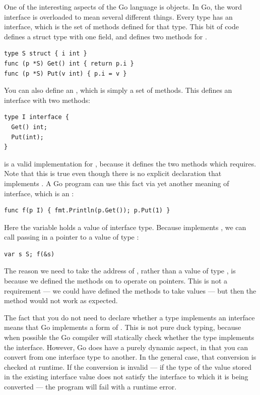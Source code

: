 \noindent{}One of the interesting aspects of the Go language is  objects.
In Go, the word interface is overloaded to mean several different
things. Every type has an interface, which is the set of methods defined for
that type. This bit of code defines a struct type  with one field, and
defines two methods for .
\begin{lstlisting}
type S struct { i int }
func (p *S) Get() int { return p.i }
func (p *S) Put(v int) { p.i = v }
\end{lstlisting}
You can also define an , which is simply a set of methods.
This defines an interface  with two methods:
\begin{lstlisting}
type I interface {
  Get() int;
  Put(int);
}
\end{lstlisting}
 is a valid implementation for , because it defines the two 
methods which  requires. Note that this is true even though there is 
no explicit declaration that  implements . A Go program can use 
this fact via yet another meaning of interface, which is an :

\begin{lstlisting}
func f(p I) { fmt.Println(p.Get()); p.Put(1) }
\end{lstlisting}
Here the variable  holds a value of interface type. Because
implements , we can call  passing in a pointer to a value of type
:

\begin{lstlisting}
var s S; f(&s)
\end{lstlisting}
The reason we need to take the address of , rather than a value of type
, is because we defined the methods on  to operate on pointers. This
is not a requirement --- we could have defined the methods to take
values --- but then the  method would not work as expected.

The fact that you do not need to declare whether a type implements an
interface means that Go implements a form of . This is not
pure duck typing, because when possible the Go compiler will statically
check whether the type implements the interface. However, Go does have a
purely dynamic aspect, in that you can convert from one interface type
to another. In the general case, that conversion is checked at runtime.
If the conversion is invalid --- if the type of the value stored in the
existing interface value does not satisfy the interface to which it is
being converted --- the program will fail with a runtime error.

